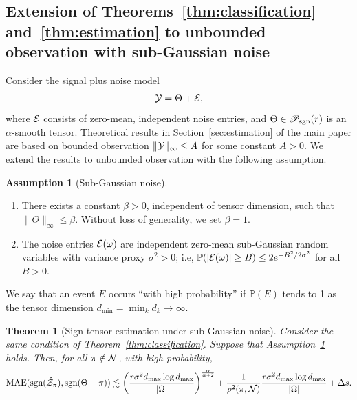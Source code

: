\documentclass[11pt]{article}
\theoremstyle{plain}
\newtheorem{thm}{Theorem}
\theoremstyle{definition}
\newtheorem{assumption}{Assumption}
\def\caliP{\mathscr{P}_{\textup{sgn}}}
\begin{document}
\subsection{Extension of Theorems~\ref{thm:classification} and~\ref{thm:estimation} to unbounded observation with sub-Gaussian noise}\label{sec:subGaussian}
Consider the signal plus noise model
\begin{align*}
\mathcal{Y} = \Theta+\mathcal{E},
\end{align*}
where $\mathcal{E}$ consists of zero-mean, independent noise entries, and $\Theta\in\caliP(r)$ is an $\alpha$-smooth tensor.
Theoretical results in Section~\ref{sec:estimation} of the main paper are based on bounded observation $\|\mathcal{Y}\|_\infty\leq A$ for some constant $A>0$. We extend the results to unbounded observation with the following assumption.
\begin{assumption}[Sub-Gaussian noise]\label{assm:subg}\text{ }
\begin{enumerate}
\item There exists a constant $\beta>0$, independent of tensor dimension, such that $\|\Theta\|_\infty\leq \beta$. Without loss of generality, we set $\beta = 1$.
\item The noise entries $\mathcal{E}(\omega)$ are independent zero-mean sub-Gaussian random variables with variance proxy $\sigma^2>0$; i.e, $\mathbb{P}(|\mathcal{E}(\omega)|\geq B)\leq 2e^{-B^2/2\sigma^2}$ for all $B>0$.  
\end{enumerate}
\end{assumption}


We say that an event $E$ occurs ``with high probability'' if $\mathbb{P}(E)$ tends to 1 as the tensor dimension $d_{\min}=\min_k d_k\to \infty$. 
\begin{thm}[Sign tensor estimation under sub-Gaussian noise]\label{thm:unbddno1}
Consider the same condition of Theorem~\ref{thm:classification}.   Suppose that Assumption~\ref{assm:subg} holds. Then, for all $\pi\notin \mathcal{N}$, with high probability,
\begin{align}
 \textup{MAE}(\textup{sgn}(\hat {\mathcal{Z}}_\pi),\textup{sgn}(\Theta-\pi))\lesssim \left(r\sigma^2d_{\max}\log d_{\max}\over |\Omega|\right)^{\alpha\over \alpha+2}+\frac{1}{\rho^2(\pi,\mathcal{N})}{r\sigma^2d_{\max}\log d_{\max}\over |\Omega|}+\Delta s.
\end{align}
\end{thm}
\end{document}
